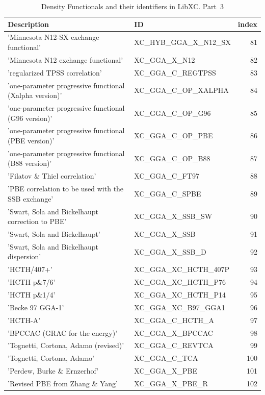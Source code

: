 \documentclass[final,12pt,makeidx,DIV=calc]{article}
\begin{document}
{{{\begin{table}[!h]
\caption{Density Functionals and their identifiers in LibXC. Part~3}
\begin{center}
\begin{tabular}{llr}
\hline
\hline
Description & ID & index\\
\hline
  'Minnesota N12-SX exchange functional' & XC\_HYB\_GGA\_X\_N12\_SX  & 81\\
  'Minnesota N12 exchange functional' & XC\_GGA\_X\_N12  & 82\\
  'regularized TPSS correlation' & XC\_GGA\_C\_REGTPSS  & 83\\
  'one-parameter progressive functional (Xalpha version)' & XC\_GGA\_C\_OP\_XALPHA  & 84\\
  'one-parameter progressive functional (G96 version)' & XC\_GGA\_C\_OP\_G96  & 85\\
  'one-parameter progressive functional (PBE version)' & XC\_GGA\_C\_OP\_PBE  & 86\\
  'one-parameter progressive functional (B88 version)' & XC\_GGA\_C\_OP\_B88  & 87\\
  'Filatov \& Thiel correlation' & XC\_GGA\_C\_FT97  & 88\\
  'PBE correlation to be used with the SSB exchange' & XC\_GGA\_C\_SPBE  & 89\\
  'Swart, Sola and Bickelhaupt correction to PBE' & XC\_GGA\_X\_SSB\_SW  & 90\\
  'Swart, Sola and Bickelhaupt' & XC\_GGA\_X\_SSB  & 91\\
  'Swart, Sola and Bickelhaupt dispersion' & XC\_GGA\_X\_SSB\_D  & 92\\
  'HCTH/407+' & XC\_GGA\_XC\_HCTH\_407P  & 93\\
  'HCTH p\&7/6' & XC\_GGA\_XC\_HCTH\_P76  & 94\\
  'HCTH p\&1/4' & XC\_GGA\_XC\_HCTH\_P14  & 95\\
  'Becke 97 GGA-1' & XC\_GGA\_XC\_B97\_GGA1  & 96\\
  'HCTH-A' & XC\_GGA\_C\_HCTH\_A  & 97\\
  'BPCCAC (GRAC for the energy)' & XC\_GGA\_X\_BPCCAC  & 98\\
  'Tognetti, Cortona, Adamo (revised)' & XC\_GGA\_C\_REVTCA  & 99\\
  'Tognetti, Cortona, Adamo' & XC\_GGA\_C\_TCA  &100\\
  'Perdew, Burke \& Ernzerhof' & XC\_GGA\_X\_PBE  &101\\
  'Revised PBE from Zhang \& Yang' & XC\_GGA\_X\_PBE\_R  &102\\

\end{tabular}
\end{center}
\end{table}}}}
\end{document}
